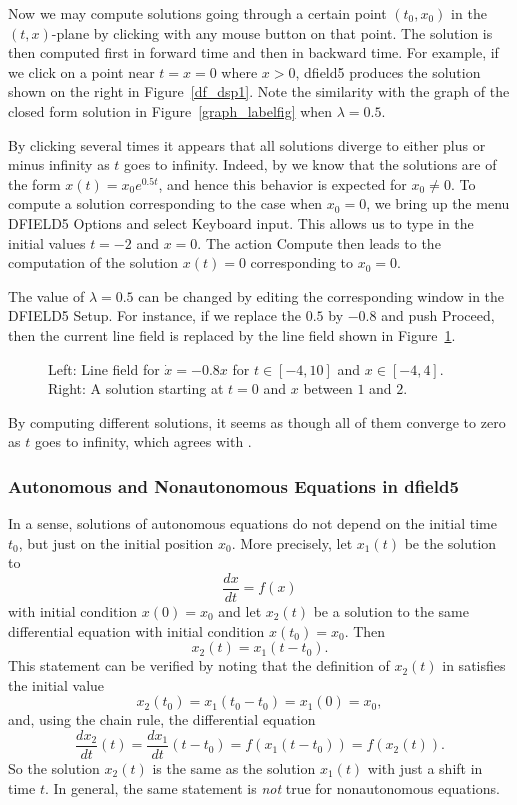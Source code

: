 Now we may compute solutions going through a certain point
$(t_0,x_0)$ in the $(t,x)$-plane by clicking with any mouse
button on that point.  The solution is then computed first in
forward time and then in backward time.  For example, if we
click on a point near $t=x=0$ where $x>0$, {\sf dfield5} produces
the solution shown on the right in Figure~\ref{df_dsp1}.  Note
the similarity with the graph of the closed form solution in
Figure~\ref{graph_labelfig} when $\lambda=0.5$.

By clicking several times it appears that all solutions diverge
to either plus or minus infinity as $t$ goes to infinity.
Indeed, by  we know that the solutions are of the
form $x(t) = x_0 e^{0.5 t}$, and hence this behavior is expected
for $x_0\not= 0$.  To compute a solution corresponding to the case
when $x_0=0$, we bring up the menu {\sf DFIELD5 Options} and select
{\sf Keyboard input}.  This allows us to type in the initial
values $t=-2$ and $x=0$.  The action {\sf Compute} then leads to
the computation of the solution $x(t)=0$ corresponding to $x_0=0$.

The value of $\lambda=0.5$ can be changed by editing the
corresponding window in the {\sf DFIELD5 Setup.} For instance, if
we replace the $0.5$ by $-0.8$ and push {\sf Proceed}, then the
current line field is replaced by the line field shown
in Figure~\ref{df_dsp2}.
\begin{figure}[htb]
    \centerline{%
    }
    \caption{Left: Line field for $\dot{x}=-0.8 x$ for $t\in [-4,10]$
	and $x\in [-4,4]$.  Right: A solution starting at $t=0$ and
	$x$ between $1$ and $2$.}
    \label{df_dsp2}
\end{figure}

By computing different solutions, it seems as though all of them
converge to zero as $t$ goes to infinity, which agrees with
.


\subsubsection*{Autonomous and Nonautonomous Equations in {\sf dfield5}}

In a sense, solutions of autonomous equations do not depend on the initial
time $t_0$, but just on the initial position $x_0$.  More precisely, let
$x_1(t)$ be the solution to
\[
\frac{dx}{dt} = f(x)
\]
with initial condition $x(0)=x_0$ and let $x_2(t)$ be a solution
to the same differential equation with initial condition $x(t_0)=x_0$.
Then
\begin{equation}  \label{E:initdiff}
x_2(t) = x_1(t-t_0).
\end{equation}
This statement can be verified by noting that the definition of
$x_2(t)$ in  satisfies the initial value
\[
x_2(t_0)=x_1(t_0-t_0)=x_1(0)=x_0,
\]
and, using the chain rule, the differential equation
\[
\frac{dx_2}{dt}(t) = \frac{dx_1}{dt}(t-t_0) = f(x_1(t-t_0))=f(x_2(t)).
\]
So the solution $x_2(t)$ is the same as the solution $x_1(t)$ with
just a shift in time $t$.  In general, the same statement is {\em not\/} 
true for nonautonomous equations.

